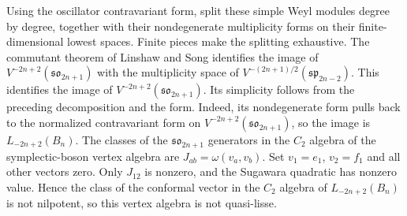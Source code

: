 \documentclass[11pt,a4paper]{amsart}
\numberwithin{equation}{section}
\theoremstyle{definition}
\theoremstyle{remark}
\newcommand{\spg}{\mathfrak{sp}}
\newcommand{\sog}{\mathfrak{so}}
\begin{document}
Using the oscillator contravariant form, split these simple Weyl
modules degree by degree, together with their nondegenerate multiplicity forms on their
finite-dimensional lowest spaces. Finite pieces make the splitting exhaustive.
The commutant theorem of Linshaw and Song
\cite[Theorem~6.1]{LinshawSong2024} identifies the image of
$V^{-2n+2}(\sog_{2n+1})$ with the multiplicity space of
$V^{-(2n+1)/2}(\spg_{2n-2})$. This identifies the image of $V^{-2n+2}(\sog_{2n+1})$.
Its simplicity follows from the preceding decomposition and the form.
Indeed, its nondegenerate form pulls back
to the normalized contravariant form on $V^{-2n+2}(\sog_{2n+1})$,
so the image is $L_{-2n+2}(B_n)$. The classes of the
$\sog_{2n+1}$ generators in the $C_2$ algebra of the symplectic-boson
vertex algebra are $J_{ab}=\omega(v_a,v_b)$. Set $v_1=e_1$, $v_2=f_1$ and
all other vectors zero. Only $J_{12}$ is nonzero, and the Sugawara
quadratic has nonzero value. Hence the class of the conformal vector
in the $C_2$ algebra of $L_{-2n+2}(B_n)$ is not nilpotent, so this
vertex algebra is not quasi-lisse.
\end{document}
